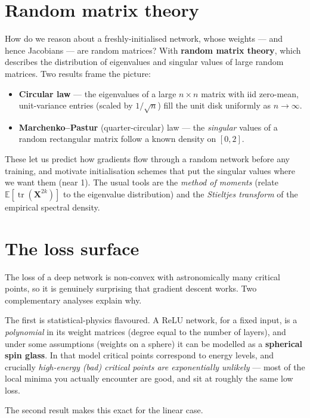 \documentclass[11pt, oneside]{book}
\newcommand{\E}{\mathbb{E}}              %
\newcommand{\tr}{\operatorname{tr}}
\begin{document}
\section{Random matrix theory}

How do we reason about a freshly-initialised network, whose weights --- and hence
Jacobians --- are random matrices? With \textbf{random matrix theory}, which
describes the distribution of eigenvalues and singular values of large random
matrices. Two results frame the picture:
\begin{itemize}
  \item \textbf{Circular law} --- the eigenvalues of a large $n\times n$ matrix with
        iid zero-mean, unit-variance entries (scaled by $1/\sqrt n$) fill the unit
        disk uniformly as $n\to\infty$.
  \item \textbf{Marchenko--Pastur} (quarter-circular) law --- the \emph{singular}
        values of a random rectangular matrix follow a known density on $[0,2]$.
\end{itemize}
These let us predict how gradients flow through a random network before any
training, and motivate initialisation schemes that put the singular values where
we want them (near 1). The usual tools are the \emph{method of moments} (relate
$\E[\tr(\mathbf{X}^{2k})]$ to the eigenvalue distribution) and the \emph{Stieltjes
transform} of the empirical spectral density.

\section{The loss surface}

The loss of a deep network is non-convex with astronomically many critical points,
so it is genuinely surprising that gradient descent works. Two complementary
analyses explain why.

The first is statistical-physics flavoured. A ReLU network, for a fixed input, is
a \emph{polynomial} in its weight matrices (degree equal to the number of layers),
and under some assumptions (weights on a sphere) it can be modelled as a
\textbf{spherical spin glass}. In that model critical points correspond to energy
levels, and crucially \emph{high-energy (bad) critical points are exponentially
unlikely} --- most of the local minima you actually encounter are good, and sit at
roughly the same low loss.

The second result makes this exact for the linear case.
\end{document}
